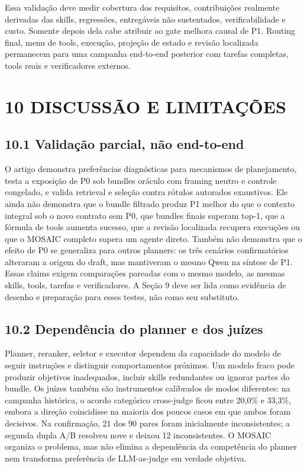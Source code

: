 \documentclass[12pt,a4paper]{article}
\begin{document}
Essa validação deve medir cobertura dos requisitos, contribuições realmente derivadas das skills, regressões, entregáveis não sustentados, verificabilidade e custo. Somente depois dela cabe atribuir ao gate melhora causal de P1. Routing final, menu de tools, execução, projeção de estado e revisão localizada permanecem para uma campanha end-to-end posterior com tarefas completas, tools reais e verificadores externos.

\section*{10 DISCUSSÃO E LIMITAÇÕES}

\subsection*{10.1 Validação parcial, não end-to-end}

O artigo demonstra preferências diagnósticas para mecanismos de planejamento, testa a exposição de P0 sob bundles oráculo com framing neutro e controle congelado, e valida retrieval e seleção contra rótulos autorados exaustivos. Ele ainda não demonstra que o bundle filtrado produz P1 melhor do que o contexto integral sob o novo contrato sem P0, que bundles finais superam top-1, que a fórmula de tools aumenta sucesso, que a revisão localizada recupera execuções ou que o MOSAIC completo supera um agente direto. Também não demonstra que o efeito de P0 se generaliza para outros planners: os três cenários confirmatórios alteraram a origem do draft, mas mantiveram o mesmo Qwen na síntese de P1. Essas claims exigem comparações pareadas com o mesmo modelo, as mesmas skills, tools, tarefas e verificadores. A Seção 9 deve ser lida como evidência de desenho e preparação para esses testes, não como seu substituto.


\subsection*{10.2 Dependência do planner e dos juízes}

Planner, reranker, seletor e executor dependem da capacidade do modelo de seguir instruções e distinguir comportamentos próximos. Um modelo fraco pode produzir objetivos inadequados, incluir skills redundantes ou ignorar partes do bundle. Os juízes também são instrumentos calibrados de modos diferentes: na campanha histórica, o acordo categórico cross-judge ficou entre 20,0\% e 33,3\%, embora a direção coincidisse na maioria dos poucos casos em que ambos foram decisivos. Na confirmação, 21 dos 90 pares foram inicialmente inconsistentes; a segunda dupla A/B resolveu nove e deixou 12 inconsistentes. O MOSAIC organiza o problema, mas não elimina a dependência da competência do planner nem transforma preferência de LLM-as-judge em verdade objetiva.
\end{document}
